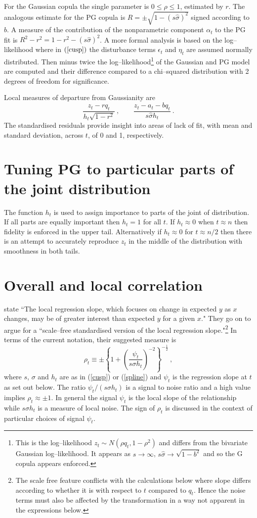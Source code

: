 \documentclass[authoryear]{elsarticle}
\newcommand{\eps}{\epsilon}
\newcommand{\eref}[1]{(\ref{#1})}
\newcommand{\cq}{\ , \qquad}
\newcommand{\be}[1]{\begin{equation}\label{#1}}
\newcommand{\ee}{\end{equation}}
\begin{document}
For the Gaussian copula the single parameter is $0\le\rho\le 1$, estimated by  $r$.   The analogous estimate for the PG copula is $R=\pm\sqrt{1-(s\hat\sigma)^2}$ signed according to $b$.   A measure of the  contribution of the nonparametric component $\alpha_t$  to the PG fit is  
$
R^2-r^2 = 1-r^2 - (s\hat\sigma)^2
$.
A more formal analysis is based on the log--likelihood where in $\eref{cusp}$ the disturbance terms $\eps_t$ and $\eta_t$ are assumed normally distributed.    Then  minus twice the log--likelihood\footnote{This is the log--likelihood $z_t\sim N(\rho q_t,1-\rho^2)$ and differs from the bivariate Gaussian log--likelihood.  It appears  as  $s\rightarrow\infty$, $s\hat\sigma\rightarrow\sqrt{ 1-b^2}$ and so the G copula appears enforced.}  of the Gaussian and  PG model  are computed and their difference compared to a chi--squared distribution with 2 degrees of freedom for significance.

Local  measures of departure from Gaussianity are 
\be{lr}
\frac{z_t-r q_t}{h_t\sqrt{1-r^2}}\cq \frac{z_t-a_t-bq_t}{ s\hat\sigma h_t}\ .
\ee
The  standardised residuals
provide insight into areas of lack of fit, with mean and standard deviation, across $t$,  of 0 and 1, respectively.

\section{Tuning PG to particular parts of the joint distribution}
The function $h_t$ is used to assign  importance to parts of the joint of distribution.  If all parts are equally important then $h_t=1$ for all $t$.   If $h_t\approx 0$ when $t\approx n$ then fidelity  is enforced in the upper tail.  Alternatively if $h_t\approx 0$ for $t\approx n/2$ then there is an attempt to accurately reproduce $z_t$ in the middle of the distribution with smoothness  in both tails.
\section{Overall and local correlation}

\cite{bjerve1993correlation} state ``The local regression slope, which focuses on change in expected $y$ as $x$ changes, may be of greater interest than expected  $y$ for a given $x$." They go on to argue for  a  ``scale--free standardised version of the local regression slope."\footnote{The scale free feature conflicts with the calculations below where  slope differs according to whether it is with respect to $t$ compared to $q_t$.  Hence the noise terms must also be affected by the transformation in a way not apparent in the expressions below.} In terms of the current notation, their suggested measure is 
\be{rhot}
 \rho_t\equiv\pm\left\{1+\left(\frac{\psi_t}{s\sigma h_t}\right)^{-2}\right\}^{-\frac{1}{2}}\ ,
\ee
where $s$, $\sigma$ and $h_t$ are as in \eref{cusp} or \eref{spline} and $\psi_t$ is the regression slope at $t$ as set out below.  The ratio $\psi_t/(s\sigma h_t)$ is a signal to noise ratio and a high value implies $\rho_t\approx \pm 1$.    In general the signal  $\psi_t$ is the local slope of the relationship while $s\sigma h_t$ is a measure of local noise.   The sign of $\rho_t$ is discussed in the context of particular choices of signal $\psi_t$.  
\end{document}
